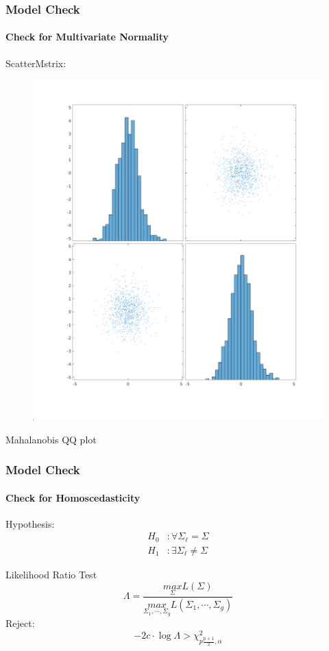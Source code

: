 \documentclass[aspectratio=169,10pt,t]{beamer}
\begin{document}
\begin{frame}[t]
	\frametitle{Model Check}
	\framesubtitle{Check for Multivariate Normality}
    ScatterMstrix:
    \begin{figure}
        \centering
        \includegraphics[scale =0.18]{03/images/scatterplot.png}
    \end{figure}
    Mahalanobis QQ plot

\end{frame}
\begin{frame}[t]
	\frametitle{Model Check}
	\framesubtitle{Check for Homoscedasticity}
    Hypothesis:
	\[
		\begin{aligned}
			H_0 &: \forall \Sigma_\ell = \Sigma\\
			H_1 &: \exists \Sigma_\ell \neq \Sigma
		\end{aligned}
	\] 
    
    Likelihood Ratio Test
\[
\Lambda = \frac{\underset{\Sigma}{max}L(\Sigma)}{\underset{\Sigma_1,\cdots,\Sigma_g}{max}L(\Sigma_1,\cdots,\Sigma_g)}  
\] 
    Reject:
    \[
        -2c \cdot \log\Lambda > \chi^2_{p \frac{p+1}{2}, \alpha}

    \] 

\end{frame}
\end{document}
